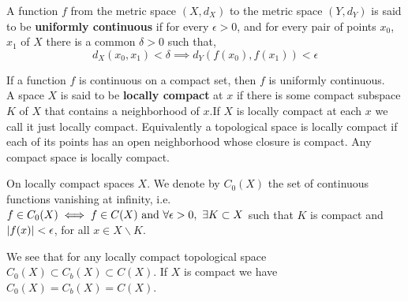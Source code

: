   
 \begin{definition}
	A function $f$ from the metric space $(X, d_X)$ to the metric space $(Y, d_Y)$ is said to be \textbf{uniformly continuous} if for every $\epsilon>0$, and for every pair of points $x_0$, $x_1$ of $X$ there is a common $\delta>0$ such that,
	\begin{equation}
		d_X(x_0, x_1)<\delta \implies d_Y(f(x_0), f(x_1))<\epsilon
	\end{equation}  
\end{definition}
If a function $f$ is continuous on a compact set, then $f$ is uniformly continuous.\\

%
A space $X$ is said to be \textbf{locally compact} at $x$ if there is some compact subspace $K$ of $X$ that contains a neighborhood of $x$.If $X$ is locally compact at each $x$ we call it just locally compact. Equivalently a topological space is locally compact if each of its points has an open neighborhood whose closure is compact. Any compact space is locally compact.

On locally compact spaces $X$. We denote by $C_0(X)$ the set of continuous functions vanishing at infinity, i.e. $f\in C_0(X) \iff f \in C(X)\ \mathrm{and} \ \forall \epsilon >0,\ \exists K\subset X$ such that $K$ is compact and $\left| f(x) \right|<\epsilon$, for all $x\in X\backslash K$. 

We see that for any locally compact topological space $C_0(X)\subset C_b(X)\subset C(X)$. If $X$ is compact we have $C_0(X)=C_b(X)=C(X)$.



